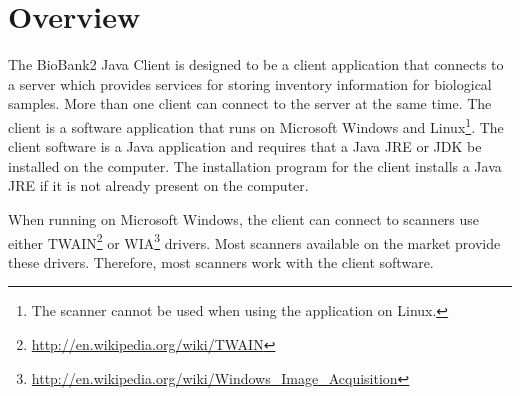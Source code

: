 \chapter{Overview}
The BioBank2 Java Client is designed to be a client application that connects
to a server which provides services for storing inventory information for
biological samples. More than one client can connect to the server at the same
time. The client is a software application that runs on Microsoft Windows and
Linux\footnote{The scanner cannot be used when using the application on Linux.}. The client
software is a Java application and requires that a Java JRE or JDK be installed
on the computer. The installation program for the client installs a Java JRE if
it is not already present on the computer.

When running on Microsoft Windows, the client can connect to scanners use either
TWAIN\footnote{\url{http://en.wikipedia.org/wiki/TWAIN}} or
WIA\footnote{\url{http://en.wikipedia.org/wiki/Windows_Image_Acquisition}}
drivers. Most scanners available on the market provide these
drivers. Therefore, most scanners work with the client software.

